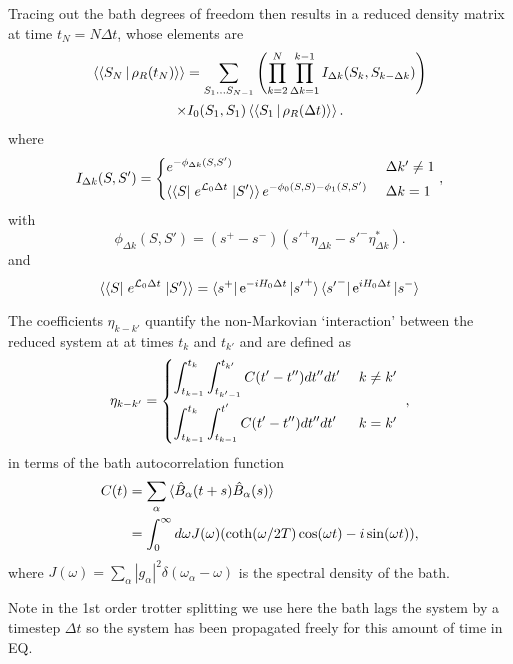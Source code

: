 \documentclass[a4paper, aps, pra,twocolumn]{revtex4-1}
\newcommand{\dket}[1]{\left.\Ket{#1}\right\rangle}
\newcommand{\dbra}[1]{\left\langle\Bra{#1}\right.}
\newcommand{\dbraket}[1]{\left\langle\Braket{#1}\right\rangle}
\begin{document}
Tracing out the bath degrees of freedom then results in a reduced density matrix at time $t_N=N\Delta t$, whose elements are 
\begin{multline}
\label{discreteevo}
\dbraket{S_N|\rho_R(t_N)}=\sum_{S_1 \ldots S_{N-1}}\left(\prod_{k=2}^N \prod_{\Delta k =1}^{k-1} I_{\Delta k}(S_k,S_{k-\Delta k})\right)\\
\times I_{0}(S_1,S_1) \dbraket{S_1 |\rho_R(\Delta t)} .
\end{multline}
where
\begin{equation}
I_{\Delta k}(S,S') = \begin{dcases*}
e^{- \phi_{\Delta k}(S,S')} &\text{ $\Delta k'\ne 1$}\\ 
\dbra{S}e^{\mathcal{L}_0 \Delta t}\dket{S'}e^{-\phi_{0}(S,S)- \phi_{1}(S,S')} &\text{ $\Delta k=1$}
\end{dcases*},
\end{equation}
with
\begin{equation}
 \phi_{\Delta k}(S,S')=(s^+-s^-)({s'}^+\eta_{\Delta k}-{s'}^-\eta_{\Delta k}^*).
\end{equation}
and 
\begin{equation}
\dbra{S}e^{\mathcal{L}_0 \Delta t}\dket{S'}= \bra{s^+}\text{e}^{-iH_0 \Delta t}\ket{{s'}^+}\bra{{s'}^-}\text{e}^{iH_0 \Delta t}\ket{s^-}
\end{equation}


The coefficients $\eta_{k-k'}$ quantify the non-Markovian `interaction' between the reduced system at at times $t_k$ and $t_{k'}$ and are defined as
\begin{equation}
\eta_{k-k'} = \begin{dcases*}
\int_{t_{k-1}}^{t_k}\int_{t_{k'-1}}^{t_{k'}}C(t'-t'')dt''dt' &\text{ $k\ne k'$}\\ 
\int_{t_{k-1}}^{t_k}\int_{t_{k-1}}^{t'}C(t'-t'')dt''dt' &\text{ $k=k'$}
\end{dcases*},
\end{equation}
in terms of the bath autocorrelation function 
\begin{align}\label{bathcorr}
C(t)&=\sum_\alpha \braket{\hat{B}_\alpha(t+s)\hat{B}_\alpha(s)}\\
&=\int_0^\infty d\omega J(\omega)(\coth( \omega/2 T)\cos(\omega t)-i \sin(\omega t)),
\end{align}
where $J(\omega)=\sum_\alpha |g_\alpha|^2 \delta(\omega_\alpha-\omega)$ is the spectral density of the bath.

Note in the 1st order trotter splitting we use here the bath lags the system by a timestep $\Delta t$ so the system has been propagated freely for this amount of time in EQ.
\end{document}
